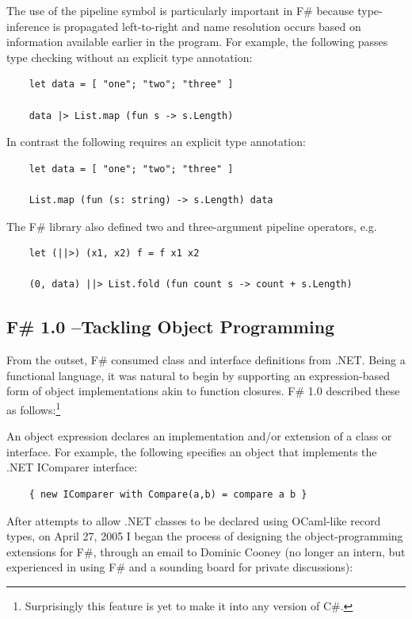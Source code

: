 \documentclass[acmsmall]{acmart}\settopmatter{}
\begin{document}
The use of the pipeline symbol is particularly important in F\# because type-inference is propagated left-to-right and name resolution occurs based on information available earlier in the program.  For example, the following passes type checking without an explicit type annotation:
\begin{verbatim}
    let data = [ "one"; "two"; "three" ] 

    data |> List.map (fun s -> s.Length)
\end{verbatim}
In contrast the following requires an explicit type annotation:
\begin{verbatim}
    let data = [ "one"; "two"; "three" ] 

    List.map (fun (s: string) -> s.Length) data
\end{verbatim}
The F\# library also defined two and three-argument pipeline operators, e.g.
\begin{verbatim}
    let (||>) (x1, x2) f = f x1 x2

    (0, data) ||> List.fold (fun count s -> count + s.Length)
\end{verbatim}

\subsection*{F\# 1.0 –Tackling Object Programming}

From the outset, F\# consumed class and interface definitions from .NET. Being a functional language, it was
natural to begin by supporting an expression-based form of object implementations akin to function closures.  F\# 1.0 described these as follows:\footnote{Surprisingly this feature is yet to make it into any version of C\#.}
\begin{verbquote}
An object expression declares an implementation and/or extension of a class or interface. For example, the following specifies an object that implements the .NET IComparer interface:
\end{verbquote}
\begin{verbatim}
    { new IComparer with Compare(a,b) = compare a b }
\end{verbatim}
After attempts to allow .NET classes to be declared using OCaml-like record types, on April 27, 2005 I began the process of designing the object-programming extensions for F\#, through an email to Dominic Cooney (no longer an intern, but experienced in using F\# and a sounding board for private discussions):
\end{document}
